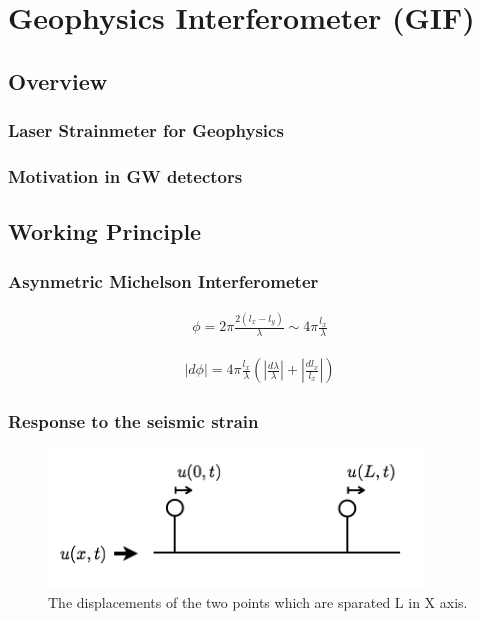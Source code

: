 \chapter{Geophysics Interferometer (GIF)}



\section{Overview} 
\subsection{Laser Strainmeter for Geophysics}
\subsection{Motivation in GW detectors}


\section{Working Principle}

\subsection{Asynmetric Michelson Interferometer}
\begin{eqnarray}
  \phi = 2\pi\frac{2(l_x-l_y)}{\lambda}\sim4\pi\frac{l_x}{\lambda}
\end{eqnarray}

\begin{eqnarray}
  |d\phi| = 4\pi\frac{l_x}{\lambda}\left( \left|\frac{d\lambda}{\lambda}\right| + \left|\frac{dl_x}{l_x}\right| \right)
\end{eqnarray}


\subsection{Response to the seismic strain}
\begin{figure}[h]
  \begin{center}
    \includegraphics[width=10.0cm]{./img_chap4/img410.png}
    \caption{The displacements of the two points which are sparated L in X axis. }
  \end{center}
\end{figure}

